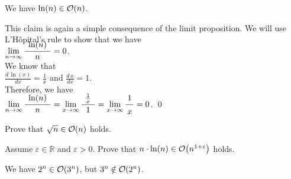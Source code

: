 \example
We have $\ln(n) \in \mathcal{O}(n)$.

\proof
This claim is again a simple consequence of the limit proposition.  We will use L'H\^opital's rule
to show that we have
\\[0.2cm]
\hspace*{1.3cm} 
$\lim\limits_{n \rightarrow \infty} \bruch{\;\ln(n)\;}{n} = 0$.
\\[0.2cm]
We know that \\[0.2cm]
\hspace*{1.3cm} $\displaystyle \frac{d\, \ln(x)}{dx} = \frac{1}{x}$ 
\quad and \quad
 $\displaystyle \frac{d\, x}{dx} = 1$. \\[0.2cm]
Therefore, we have \\[0.2cm]
\hspace*{1.3cm} 
$\displaystyle \lim\limits_{n \rightarrow \infty} \bruch{\;\ln(n)\;}{n} = 
\lim\limits_{x \rightarrow \infty} \bruch{\rule[-10pt]{0pt}{10pt}\;\frac{1}{x}\;}{1} = 
\lim\limits_{x \rightarrow \infty} \bruch{1}{x} = 0$. \qed


\exercise
Prove that $\sqrt{n} \in \mathcal{O}(n)$ holds.  \eox

\exercise
Assume $\varepsilon \in \mathbb{R}$ and $\varepsilon > 0$.  Prove that $n \cdot \ln(n) \in \mathcal{O}\bigl(n^{1 + \varepsilon}\bigr)$
holds. \eox

\example
We have $2^n \in \mathcal{O}(3^n)$, but  $3^n \notin \mathcal{O}(2^n)$.
\eox

